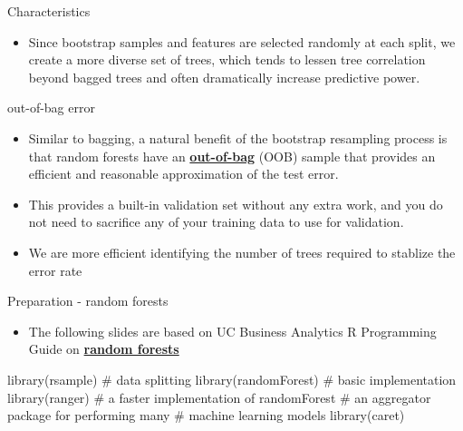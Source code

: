 \documentclass[
  10pt,
  ignorenonframetext,
]{beamer}
\newenvironment{Shaded}{}{}
\newcommand{\CommentTok}[1]{\textcolor[rgb]{0.00,0.50,0.00}{#1}}
\newcommand{\KeywordTok}[1]{\textcolor[rgb]{0.00,0.00,1.00}{#1}}
\newcommand{\NormalTok}[1]{#1}
\providecommand{\tightlist}{%
  \setlength{\itemsep}{0pt}\setlength{\parskip}{0pt}}
\begin{document}
\begin{frame}{Characteristics}
\protect\hypertarget{characteristics}{}

\begin{itemize}
\tightlist
\item
  Since bootstrap samples and features are selected randomly at each
  split, we create a more diverse set of trees, which tends to lessen
  tree correlation beyond bagged trees and often dramatically increase
  predictive power. 
\end{itemize}

\begin{block}{out-of-bag error}

\begin{itemize}
\tightlist
\item
  Similar to bagging, a natural benefit of the bootstrap resampling
  process is that random forests have an
  \href{https://en.wikipedia.org/wiki/Out-of-bag_error}{\textbf{out-of-bag}}
  (OOB) sample that provides an efficient and reasonable approximation
  of the test error.
\item
  This provides a built-in validation set without any extra work, and
  you do not need to sacrifice any of your training data to use for
  validation.
\item
  We are more efficient identifying the number of trees required to
  stablize the error rate 
\end{itemize}

\end{block}

\end{frame}

\begin{frame}[fragile]{Preparation - random forests}
\protect\hypertarget{preparation---random-forests}{}

\begin{itemize}
\tightlist
\item
  The following slides are based on UC Business Analytics R Programming
  Guide on \href{http://uc-r.github.io/random_forests}{\textbf{random
  forests}}
\end{itemize}

\begin{Shaded}
\begin{Highlighting}[]
\KeywordTok{library}\NormalTok{(rsample)      }\CommentTok{# data splitting }
\KeywordTok{library}\NormalTok{(randomForest) }\CommentTok{# basic implementation}
\KeywordTok{library}\NormalTok{(ranger)       }\CommentTok{# a faster implementation of randomForest}
\CommentTok{# an aggregator package for performing many }
\CommentTok{# machine learning models}
\KeywordTok{library}\NormalTok{(caret)        }
\end{Highlighting}
\end{Shaded}

\end{frame}
\end{document}
